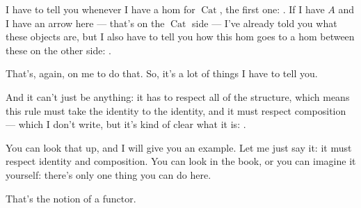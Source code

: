 \begin{speech}[01:23:55 - 01:25:22]
 I have to tell you whenever I have a hom for $\operatorname{Cat}$, the first one: . If I have $A$ and I have an arrow here ---  that's on the $\operatorname{Cat}$ side --- I've already told you what these objects are,  but I also have to tell you how this hom goes to a hom between these on the other side: .

That's, again, on me to do that. So, it's a lot of things I have to tell you.

And it can't just be anything: it has to respect all of the structure, which means this rule must take the identity to the identity, and it must respect composition --- which I don't write, but it's kind of clear what it is: .

You can look that up, and I will give you an example. Let me just say it: it must respect identity and composition. You can look in the book, or you can imagine it yourself: there's only one thing you can do here.

That's the notion of a functor.
\end{speech}

